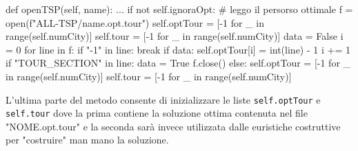 \documentclass[a4paper,12pt]{report}
\begin{document}
\begin{python}
def openTSP(self, name):
  ...
  if not self.ignoraOpt:
      # leggo il persorso ottimale
      f = open(f"ALL-TSP/{name}.opt.tour")
      self.optTour = [-1 for _ in range(self.numCity)]
      self.tour = [-1 for _ in range(self.numCity)]
      data = False
      i = 0
      for line in f:
        if "-1" in line:
          break
        if data:
          self.optTour[i] = int(line) - 1
          i += 1
        if "TOUR_SECTION" in line:
          data = True
      f.close()
  else:
    self.optTour = [-1 for _ in range(self.numCity)]
    self.tour = [-1 for _ in range(self.numCity)]
\end{python}
L'ultima parte del metodo consente di inizializzare le liste  \lstinline!self.optTour! e \lstinline!self.tour! dove la prima contiene la soluzione ottima contenuta nel file "NOME.opt.tour" e la seconda sarà invece utilizzata dalle euristiche costruttive per "costruire" man mano la soluzione.
\end{document}
